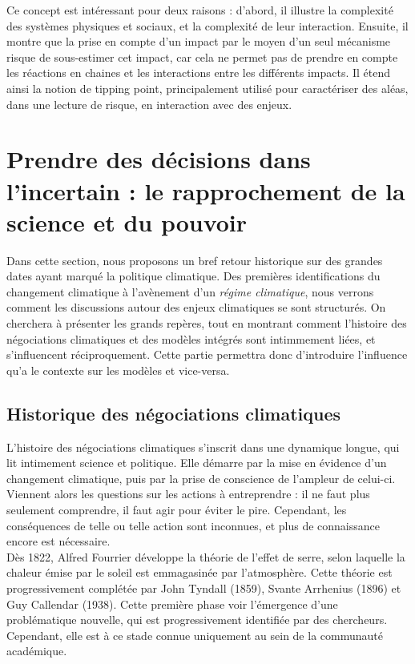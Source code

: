 Ce concept est intéressant pour deux raisons : d'abord, il illustre la complexité des systèmes physiques et sociaux, et la complexité de leur interaction. Ensuite, il montre que la prise en compte d'un impact par le moyen d'un seul mécanisme risque de sous-estimer cet impact, car cela ne permet pas de prendre en compte les réactions en chaines et les interactions entre les différents impacts. Il étend ainsi la notion de tipping point, principalement utilisé pour caractériser des aléas, dans une lecture de risque, en interaction avec des enjeux. 

\section{Prendre des décisions dans l'incertain : le rapprochement de la science et du pouvoir}
\label{sect/1/2}

Dans cette section, nous proposons un bref retour historique sur des grandes dates ayant marqué la politique climatique. Des premières identifications du changement climatique à l'avènement d'un \emph{régime climatique}, nous verrons comment les discussions autour des enjeux climatiques se sont structurés. On cherchera à présenter les grands repères, tout en montrant comment l'histoire des négociations climatiques et des modèles intégrés sont intimmement liées, et s'influencent réciproquement. Cette partie permettra donc d'introduire l'influence qu'a le contexte sur les modèles et vice-versa. 


\subsection{Historique des négociations climatiques}
\label{sect:1.2.1}

L'histoire des négociations climatiques s'inscrit dans une dynamique longue, qui lit intimement science et politique. Elle démarre par la mise en évidence d'un changement climatique, puis par la prise de conscience de l'ampleur de celui-ci. Viennent alors les questions sur les actions à entreprendre : il ne faut plus seulement comprendre, il faut agir pour éviter le pire. Cependant, les conséquences de telle ou telle action sont inconnues, et plus de connaissance encore est nécessaire. \\

Dès 1822, Alfred Fourrier développe la théorie de l'effet de serre, selon laquelle la chaleur émise par le soleil est emmagasinée par l'atmosphère. Cette théorie est progressivement complétée par John Tyndall (1859), Svante Arrhenius (1896) et Guy Callendar (1938). Cette première phase voir l'émergence d'une problématique nouvelle, qui est progressivement identifiée par des chercheurs. Cependant, elle est à ce stade connue uniquement au sein de la communauté académique. \\

